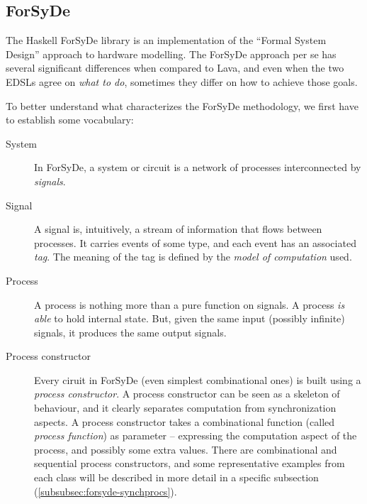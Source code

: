 \documentclass[a4paper]{article}
\begin{document}
        \subsection{ForSyDe}
        \label{subsec:forsyde}
            The Haskell ForSyDe library is an implementation of the ``Formal System Design''
            approach to hardware modelling\cite{forsyde1999}. The ForSyDe approach per se has
            several significant differences when compared to Lava, and even when the two EDSLs agree
            on \emph{what to do}, sometimes they differ on how to achieve those goals.

            To better understand what characterizes the ForSyDe methodology, we first have to
            establish some vocabulary:
            \begin{description}
                \item[System] In ForSyDe, a system or circuit is a network of processes
                    interconnected by \emph{signals}.

                \item[Signal] A signal is, intuitively, a stream of information that flows between
                    processes. It carries events of some type, and each event has an associated
                    \emph{tag}. The meaning of the tag is defined by the \emph{model of
                        computation} used.

                \item[Process] A process is nothing more than a pure function on signals. A process
                    \emph{is able} to hold internal state. But, given the same input (possibly
                    infinite) signals, it produces the same output signals.

                \item[Process constructor] Every ciruit in ForSyDe (even simplest combinational ones)
                    is built using a \emph{process constructor}. A process constructor can be seen as
                    a skeleton of behaviour, and it clearly separates computation from
                    synchronization aspects. A process constructor takes a combinational function
                    (called \emph{process function}) as parameter -- expressing the computation
                    aspect of the process, and possibly some extra values. There are combinational
                    and sequential process constructors, and some representative examples from each
                    class will be described in more detail in a specific subsection
                    (\ref{subsubsec:forsyde-synchprocs}).
            \end{description}
\end{document}
